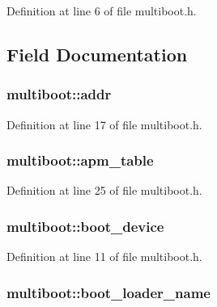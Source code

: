 Definition at line 6 of file multiboot.\-h.



\subsection{Field Documentation}
\hypertarget{structmultiboot_ab44163587f7ba8ca8f2b21e38a460525}{
\subsubsection[{addr}]{ multiboot\-::addr}}\label{structmultiboot_ab44163587f7ba8ca8f2b21e38a460525}


Definition at line 17 of file multiboot.\-h.

\hypertarget{structmultiboot_a311fadc6cf55014adab6d4ac4f78b96b}{
\subsubsection[{apm\-\_\-table}]{ multiboot\-::apm\-\_\-table}}\label{structmultiboot_a311fadc6cf55014adab6d4ac4f78b96b}


Definition at line 25 of file multiboot.\-h.

\hypertarget{structmultiboot_adf150e01b0cdf6f201914cd8a44272f9}{
\subsubsection[{boot\-\_\-device}]{ multiboot\-::boot\-\_\-device}}\label{structmultiboot_adf150e01b0cdf6f201914cd8a44272f9}


Definition at line 11 of file multiboot.\-h.

\hypertarget{structmultiboot_a704fd81b1fd6ce2dbe7ad8ba988e0bcc}{
\subsubsection[{boot\-\_\-loader\-\_\-name}]{ multiboot\-::boot\-\_\-loader\-\_\-name}}\label{structmultiboot_a704fd81b1fd6ce2dbe7ad8ba988e0bcc}


